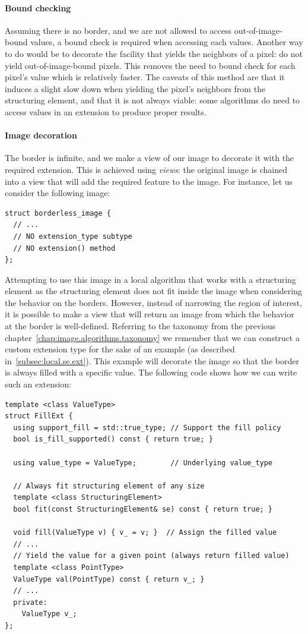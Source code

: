 \paragraph{Bound checking}
Assuming there is no border, and we are not allowed to access out-of-image-bound values, a bound check is required when
accessing each values. Another way to do would be to decorate the facility that yields the neighbors of a pixel: do not
yield out-of-image-bound pixels. This removes the need to bound check for each pixel's value which is relatively
faster. The caveats of this method are that it induces a slight slow down when yielding the pixel's neighbors from the
structuring element, and that it is not always viable: some algorithms do need to access values in an extension to
produce proper results.

\paragraph{Image decoration}
The border is infinite, and we make a view of our image to decorate it with the required extension. This is achieved
using \emph{views}: the original image is chained into a view that will add the required feature to the image. For instance, let us consider the following image:
\begin{verbatim}
struct borderless_image {
  // ...
  // NO extension_type subtype
  // NO extension() method
};
\end{verbatim}

Attempting to use this image in a local algorithm that works with a structuring element as the structuring element does
not fit inside the image when considering the behavior on the borders. However, instead of narrowing the region of
interest, it is possible to make a view that will return an image from which the behavior at the border is well-defined.
Referring to the taxonomy from the previous chapter~\ref{chap:image.algorithms.taxonomy} we remember that we can
construct a custom extension type for the sake of an example (as described in~\cref{subsec:local.se.ext}). This example
will decorate the image so that the border is always filled with a specific value. The following code shows how we can
write such an extension:
\begin{verbatim}
template <class ValueType>
struct FillExt {
  using support_fill = std::true_type; // Support the fill policy
  bool is_fill_supported() const { return true; }

  using value_type = ValueType;        // Underlying value_type

  // Always fit structuring element of any size
  template <class StructuringElement>
  bool fit(const StructuringElement& se) const { return true; }

  void fill(ValueType v) { v_ = v; }  // Assign the filled value
  // ...
  // Yield the value for a given point (always return filled value)
  template <class PointType>
  ValueType val(PointType) const { return v_; }
  // ...
  private:
    ValueType v_;
};
\end{verbatim}

